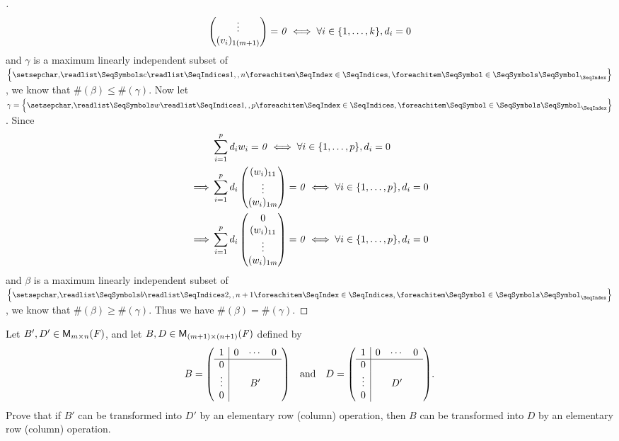 \begin{proof}[]
\begin{align*}
\begin{pmatrix}
			                              \vdots      \\
			                              (v_i)_{1 (m + 1)}
		                              \end{pmatrix} = \zv \iff \forall i \in \set{1, \dots, k}, d_i = 0
	\end{align*}
	and \(\gamma\) is a maximum linearly independent subset of \(\set{\seq{c}{1,,n}}\), we know that \(\#(\beta) \leq \#(\gamma)\).
	Now let \(\gamma = \set{\seq{w}{1,,p}}\).
	Since
	\begin{align*}
		         & \sum_{i = 1}^p d_i w_i = \zv \iff \forall i \in \set{1, \dots, p}, d_i = 0           \\
		\implies & \sum_{i = 1}^p d_i \begin{pmatrix}
			                              (w_i)_{1 1} \\
			                              \vdots      \\
			                              (w_i)_{1 m}
		                              \end{pmatrix} = \zv \iff \forall i \in \set{1, \dots, p}, d_i = 0 \\
		\implies & \sum_{i = 1}^p d_i \begin{pmatrix}
			                              0           \\
			                              (w_i)_{1 1} \\
			                              \vdots      \\
			                              (w_i)_{1 m}
		                              \end{pmatrix} = \zv \iff \forall i \in \set{1, \dots, p}, d_i = 0 \\
	\end{align*}
	and \(\beta\) is a maximum linearly independent subset of \(\set{\seq{b}{2,,n+1}}\), we know that \(\#(\beta) \geq \#(\gamma)\).
	Thus we have \(\#(\beta) = \#(\gamma)\).
\end{proof}

\begin{ex}\label{ex:3.2.12}
	Let \(B', D' \in \mathsf{M}_{{m} \times n}({\mathit{F}})\), and let \(B, D \in \mathsf{M}_{{(m + 1)} \times (n + 1)}({\mathit{F}})\) defined by
	\[
		B = \pa{\begin{array}{c|ccc}
				1      & 0 & \cdots & 0 \\
				\hline
				0      &   &        &   \\
				\vdots &   & B'     &   \\
				0      &   &        &
			\end{array}} \quad \text{and} \quad D = \pa{\begin{array}{c|ccc}
				1      & 0 & \cdots & 0 \\
				\hline
				0      &   &        &   \\
				\vdots &   & D'     &   \\
				0      &   &        &
			\end{array}}.
	\]
	Prove that if \(B'\) can be transformed into \(D'\) by an elementary row (column) operation, then \(B\) can be transformed into \(D\) by an elementary row (column) operation.
\end{ex}

